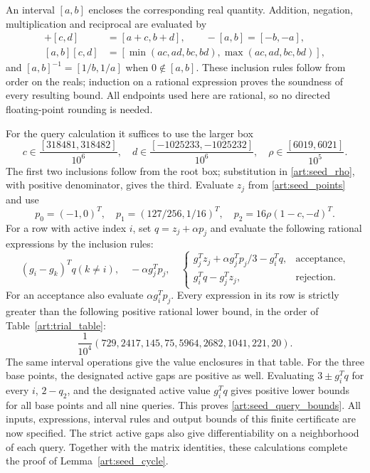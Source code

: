 An interval $[a,b]$ encloses the corresponding real quantity. Addition,
negation, multiplication and reciprocal are evaluated by
\begin{align*}
 [a,b]+[c,d]&=[a+c,b+d],\qquad -[a,b]=[-b,-a],\\
 [a,b][c,d]&=[\min(ac,ad,bc,bd),\max(ac,ad,bc,bd)],
\end{align*}
and $[a,b]^{-1}=[1/b,1/a]$ when $0\notin[a,b]$.
These inclusion rules follow from order on the reals; induction on a
rational expression proves the soundness of every resulting bound.
All endpoints used here are rational, so no directed floating-point
rounding is needed.

For the query calculation it suffices to use the larger box
\begin{equation}\label{art:query_box}
 c\in\frac{[318481,318482]}{10^6},\quad
 d\in\frac{[-1025233,-1025232]}{10^6},\quad
 \rho\in\frac{[6019,6021]}{10^5}.
\end{equation}
The first two inclusions follow from the root box; substitution in
\eqref{art:seed_rho}, with positive denominator, gives the third.
Evaluate $z_j$ from \eqref{art:seed_points} and use
\[
 p_0=(-1,0)^T,\quad p_1=(127/256,1/16)^T,\quad
 p_2=16\rho(1-c,-d)^T.
\]
For a row with active index $i$, set $q=z_j+\alpha p_j$ and evaluate
the following rational expressions by the inclusion rules:
\[
 (g_i-g_k)^Tq (k\ne i),\quad -\alpha g_j^Tp_j,\quad
 \begin{cases}
 g_j^Tz_j+\alpha g_j^Tp_j/3-g_i^Tq,&\text{acceptance},\\
 g_i^Tq-g_j^Tz_j,&\text{rejection}.
 \end{cases}
\]
For an acceptance also evaluate $\alpha g_i^Tp_j$.
Every expression in its row is strictly greater than the following
positive rational lower bound, in the order of Table~\ref{art:trial_table}:
\begin{equation}\label{art:query_lower_bounds}
 \frac1{10^4}(729, 2417, 145, 75, 5964, 2682, 1041, 221, 20).
\end{equation}
The same interval operations give the value enclosures in that table.
For the three base points, the designated active gaps are positive as
well. Evaluating $3\pm g_i^Tq$ for every $i$, $2-q_2$, and the
designated active value $g_i^Tq$ gives positive lower bounds for all base
points and all nine queries. This proves
\eqref{art:seed_query_bounds}. All inputs, expressions, interval rules
and output bounds of this finite certificate are now specified. The
strict active gaps also give differentiability on a neighborhood of
each query. Together with the matrix identities, these calculations
complete the proof of Lemma~\ref{art:seed_cycle}.
